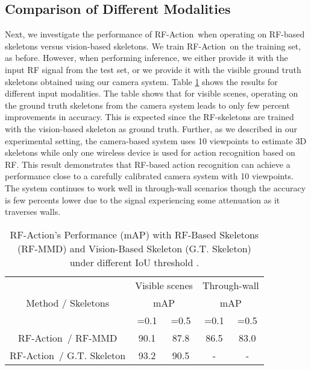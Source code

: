\documentclass[10pt,twocolumn,letterpaper]{article}
\newcommand{\name} {RF-Action}
\begin{document}
\subsection{Comparison of Different Modalities}
Next, we investigate the performance of \name\ when operating on RF-based skeletons versus vision-based skeletons. 
We train \name\ on the training set, as before. However, when performing inference, we either provide it with the input RF signal from the test set, or we provide it with the visible ground truth skeletons obtained using our camera system. 
Table \ref{tab:ap_main_vision} shows the results for different input modalities. The table shows that for visible scenes, operating on the ground truth skeletons from the camera system leads to only few percent improvements in accuracy. This is expected since the RF-skeletons are trained with the vision-based skeleton as ground truth. Further, 
as we described in our experimental setting, the camera-based system uses 10 viewpoints to estimate 3D skeletons while only one wireless device is used for action recognition based on RF. This result demonstrates that RF-based action recognition can achieve a performance close to a carefully calibrated camera system with 10 viewpoints. The system continues to work well in through-wall scenarios though the accuracy is few percents lower due to the signal experiencing some attenuation as it traverses walls. 

\begin{table}[htbp]
  \small
      \vspace{-5pt}
    \centering
    \begin{tabular}{ccccc}
        \hline
        \multirow{3}{*}{Method / Skeletons } & \multicolumn{2}{c}{Visible scenes} & \multicolumn{2}{c}{Through-wall}\\ \cmidrule(lr){2-3} \cmidrule(lr){4-5}
        & \multicolumn{2}{c}{mAP} & \multicolumn{2}{c}{mAP}\\ 
        & =0.1 & =0.5 &  =0.1 & =0.5 \\
        \hline
        \name\ / RF-MMD & 90.1 & 87.8 & 86.5 & 83.0\\
        \name\ / G.T. Skeleton & 93.2 & 90.5 & - & - \\
        \hline
    \end{tabular}
  \vspace{-10pt}
    \caption{\footnotesize{\name's Performance (mAP) with RF-Based Skeletons (RF-MMD) and Vision-Based Skeleton (G.T. Skeleton) under different IoU threshold .}}
  \vspace{-10pt}
  \label{tab:ap_main_vision}
\end{table}
\end{document}

